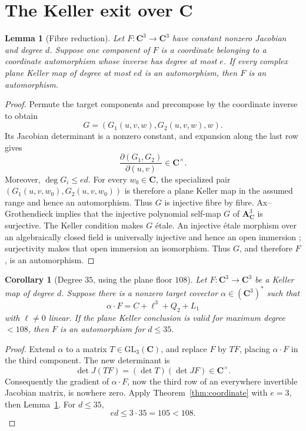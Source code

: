 \documentclass[11pt]{article}
\newtheorem{corollary}[theorem]{Corollary}
\newtheorem{lemma}[theorem]{Lemma}
\newcommand{\A}{\mathbf A}
\newcommand{\C}{\mathbf C}
\begin{document}
\section{The Keller exit over \(\C\)}

\begin{lemma}[Fibre reduction]\label{lem:fibre}
Let \(F:\C^3\to\C^3\) have constant nonzero Jacobian and degree \(d\).
Suppose one component of \(F\) is a coordinate belonging to a
coordinate automorphism whose inverse has degree at most \(e\).  If
every complex plane Keller map of degree at most \(ed\) is an
automorphism, then \(F\) is an automorphism.
\end{lemma}

\begin{proof}
Permute the target components and precompose by the coordinate inverse
to obtain
\[
G=(G_1(u,v,w),G_2(u,v,w),w).
\]
Its Jacobian determinant is a nonzero constant, and expansion along the
last row gives
\[
\frac{\partial(G_1,G_2)}{\partial(u,v)}\in\C^\times.
\]
Moreover, \(\deg G_i\le ed\).  For every \(w_0\in\C\), the specialized
pair \((G_1(u,v,w_0),G_2(u,v,w_0))\) is therefore a plane Keller map in
the assumed range and hence an automorphism.  Thus \(G\) is injective
fibre by fibre.  Ax--Grothendieck implies that the injective polynomial
self-map \(G\) of \(\A^3_\C\) is surjective.  The Keller condition makes
\(G\) étale.  An injective étale morphism over an algebraically closed
field is universally injective and hence an open immersion
\cite{StacksEtale}; surjectivity makes that open immersion an
isomorphism.  Thus \(G\), and therefore \(F\), is an automorphism.
\end{proof}

\begin{corollary}[Degree \(35\), using the plane floor \(108\)]
\label{cor:35}
Let \(F:\C^3\to\C^3\) be a Keller map of degree \(d\).  Suppose there is
a nonzero target covector \(\alpha\in(\C^3)^*\) such that
\[
\alpha\!\cdot\!F=C+\ell^3+Q_2+L_1
\]
with \(\ell\ne0\) linear.  If the plane Keller conclusion is valid for
maximum degree \(<108\), then \(F\) is an automorphism for \(d\le35\).
\end{corollary}

\begin{proof}
Extend \(\alpha\) to a matrix \(T\in\mathrm{GL}_3(\C)\), and replace
\(F\) by \(TF\), placing \(\alpha\!\cdot\!F\) in the third component.
The new determinant is
\[
\det J(TF)=(\det T)(\det JF)\in\C^\times.
\]
Consequently the gradient of \(\alpha\!\cdot\!F\), now the third row of
an everywhere invertible Jacobian matrix, is nowhere zero.  Apply
Theorem~\ref{thm:coordinate} with \(e=3\), then
Lemma~\ref{lem:fibre}.  For \(d\le35\),
\[
ed\le3\cdot35=105<108.
\]
\end{proof}
\end{document}

